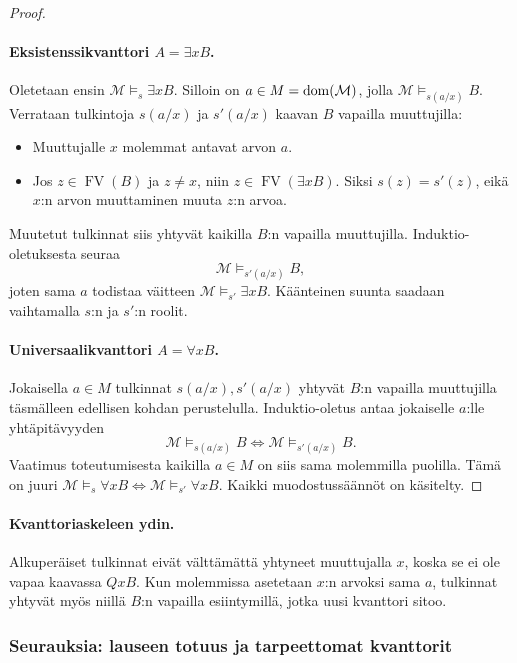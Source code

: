\documentclass[11pt,a4paper]{amsart}
\begin{document}
\begin{proof}
  \paragraph{Eksistenssikvanttori $A=\exists xB$.}
  Oletetaan ensin $\mathcal M\models_s\exists xB$. Silloin on
  $a\in M=\operatorname{dom}(\mathcal M)$, jolla
  $\mathcal M\models_{s(a/x)}B$. Verrataan tulkintoja
  $s(a/x)$ ja $s'(a/x)$ kaavan $B$ vapailla muuttujilla:
  \begin{itemize}
    \item Muuttujalle $x$ molemmat antavat arvon $a$.
    \item Jos $z\in\operatorname{FV}(B)$ ja $z\ne x$, niin
      $z\in\operatorname{FV}(\exists xB)$. Siksi $s(z)=s'(z)$,
      eikä $x$:n arvon muuttaminen muuta $z$:n arvoa.
  \end{itemize}
  Muutetut tulkinnat siis yhtyvät kaikilla $B$:n vapailla muuttujilla.
  Induktio-oletuksesta seuraa
  \[
    \mathcal M\models_{s'(a/x)}B,
  \]
  joten sama $a$ todistaa väitteen
  $\mathcal M\models_{s'}\exists xB$. Käänteinen suunta saadaan
  vaihtamalla $s$:n ja $s'$:n roolit.

  \paragraph{Universaalikvanttori $A=\forall xB$.}
  Jokaisella $a\in M$ tulkinnat $s(a/x),s'(a/x)$ yhtyvät $B$:n
  vapailla muuttujilla täsmälleen edellisen kohdan perustelulla.
  Induktio-oletus antaa jokaiselle $a$:lle yhtäpitävyyden
  \[
    \mathcal M\models_{s(a/x)}B
    \iff\mathcal M\models_{s'(a/x)}B.
  \]
  Vaatimus toteutumisesta kaikilla $a\in M$ on siis sama molemmilla
  puolilla. Tämä on juuri
  $\mathcal M\models_s\forall xB\iff
  \mathcal M\models_{s'}\forall xB$.
  Kaikki muodostussäännöt on käsitelty.
\end{proof}

\paragraph{Kvanttoriaskeleen ydin.}
Alkuperäiset tulkinnat eivät välttämättä yhtyneet muuttujalla $x$,
koska se ei ole vapaa kaavassa $QxB$. Kun molemmissa asetetaan
$x$:n arvoksi sama $a$, tulkinnat yhtyvät myös niillä $B$:n vapailla
esiintymillä, jotka uusi kvanttori sitoo.

\clearpage
\subsubsection{Seurauksia: lauseen totuus ja tarpeettomat kvanttorit}
\end{document}
